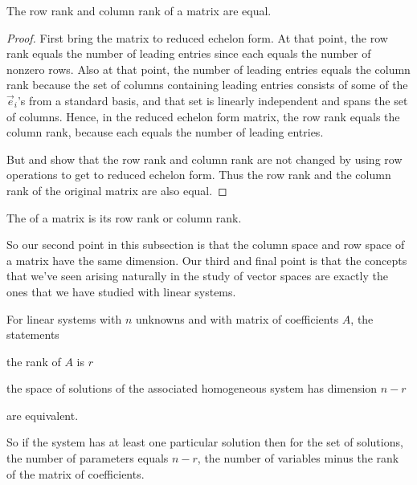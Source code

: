 \begin{theorem}
The row rank and column rank of a matrix are equal.
\end{theorem}

\begin{proof}
First bring the matrix to reduced echelon form.
At that point, the 
row rank equals the number of leading entries since each equals the
number of nonzero rows.
Also at that point, the number of leading entries
equals the column rank because the set of columns containing leading
entries consists of some of the \( \vec{e}_i \)'s from a standard
basis, and that set is linearly independent and spans the set of
columns.
Hence, in the reduced echelon form matrix, the row rank equals the column
rank, because each equals the number of leading entries.

But  and  
show that the row rank and column rank are not changed
by using row operations to get to reduced echelon form.
Thus the row rank and the column rank of the original matrix are also equal.
\end{proof}

\begin{definition}
The  of a matrix is its row rank or column rank.
\end{definition}

So our second point in this subsection is that the column space and row
space of a matrix have the same dimension.
Our third and final point is that the concepts that
we've seen arising naturally in the study of
vector spaces are exactly the ones that we have studied with linear systems.

\begin{theorem}
\label{th:RankVsSoltnSp}
For linear systems with \( n \) unknowns and with matrix of coefficients
\( A \), the statements
\begin{tfae}
   \item the rank of \( A \) is \( r \)
   \item the space of solutions of the associated homogeneous system has
     dimension \( n-r \)
\end{tfae}
are equivalent.
\end{theorem}

\par\noindent So if the system has at least one particular solution 
then for the set of
solutions, the number of parameters equals $n-r$, the number of variables
minus the rank of the matrix of coefficients. 


